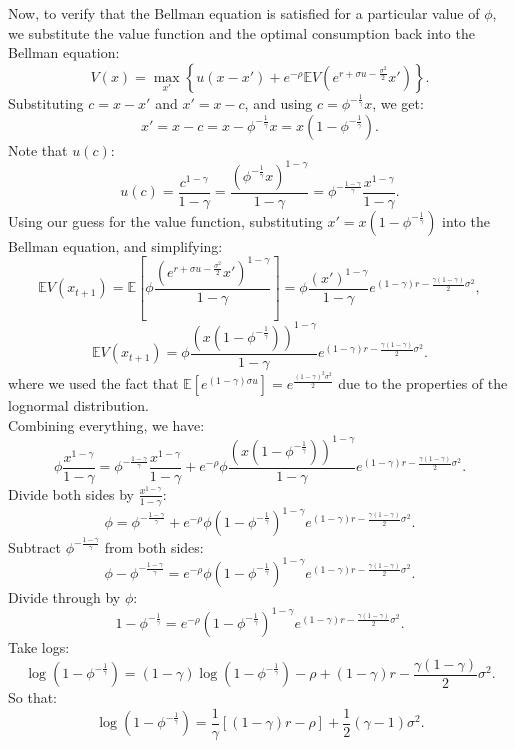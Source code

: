 \documentclass[11pt]{extarticle}
\theoremstyle{plain}
\theoremstyle{definition}
\begin{document}
\begin{enumerate}[(a)]
\begin{enumerate}[(a)]
Now, to verify that the Bellman equation is satisfied for a particular value of \( \phi \), we substitute the value function and the optimal consumption back into the Bellman equation:
\[
V(x) = \max_{x'} \left\{ u(x - x') + e^{-\rho} \mathbb{E} V\left( e^{r + \sigma u - \frac{\sigma^2}{2}} x' \right) \right\}.
\]
Substituting \( c = x - x' \) and \( x' = x - c \), and using \( c = \phi^{-\frac{1}{\gamma}} x \), we get:
\[
x' = x - c = x - \phi^{-\frac{1}{\gamma}} x = x (1 - \phi^{-\frac{1}{\gamma}}).
\]
Note that \( u(c) \):
\[
u(c) = \frac{c^{1 - \gamma}}{1 - \gamma} = \frac{(\phi^{-\frac{1}{\gamma}} x)^{1 - \gamma}}{1 - \gamma} = \phi^{-\frac{1 - \gamma}{\gamma}} \frac{x^{1 - \gamma}}{1 - \gamma}.
\]
Using our guess for the value function, substituting \( x' = x (1 - \phi^{-\frac{1}{\gamma}}) \) into the Bellman equation,  and simplifying:
\[
\mathbb{E} V(x_{t+1}) = \mathbb{E} \left[ \phi \frac{\left( e^{r + \sigma u - \frac{\sigma^2}{2}} x' \right)^{1 - \gamma}}{1 - \gamma} \right] = \phi \frac{(x')^{1 - \gamma}}{1 - \gamma} e^{(1 - \gamma) r - \frac{\gamma (1 - \gamma)}{2} \sigma^2},
\]
\[
\mathbb{E} V(x_{t+1}) = \phi \frac{\left( x (1 - \phi^{-\frac{1}{\gamma}}) \right)^{1 - \gamma}}{1 - \gamma} e^{(1 - \gamma) r - \frac{\gamma (1 - \gamma)}{2} \sigma^2}.
\]
where we used the fact that \( \mathbb{E}[e^{(1 - \gamma) \sigma u}] = e^{\frac{(1 - \gamma)^2 \sigma^2}{2}} \) due to the properties of the lognormal distribution.\\
Combining everything, we have:
\[
\phi \frac{x^{1 - \gamma}}{1 - \gamma} = \phi^{-\frac{1 - \gamma}{\gamma}} \frac{x^{1 - \gamma}}{1 - \gamma} + e^{-\rho} \phi \frac{\left( x (1 - \phi^{-\frac{1}{\gamma}}) \right)^{1 - \gamma}}{1 - \gamma} e^{(1 - \gamma) r - \frac{\gamma (1 - \gamma)}{2} \sigma^2}.
\]
Divide both sides by \( \frac{x^{1 - \gamma}}{1 - \gamma} \):
\[
\phi = \phi^{-\frac{1 - \gamma}{\gamma}} + e^{-\rho} \phi \left( 1 - \phi^{-\frac{1}{\gamma}} \right)^{1 - \gamma} e^{(1 - \gamma) r - \frac{\gamma (1 - \gamma)}{2} \sigma^2}.
\]
Subtract \( \phi^{-\frac{1 - \gamma}{\gamma}} \) from both sides:
\[
\phi - \phi^{-\frac{1 - \gamma}{\gamma}} = e^{-\rho} \phi \left( 1 - \phi^{-\frac{1}{\gamma}} \right)^{1 - \gamma} e^{(1 - \gamma) r - \frac{\gamma (1 - \gamma)}{2} \sigma^2}.
\]
Divide through by $\phi$:
\[
1 - \phi^{-\frac{1}{\gamma}} = e^{-\rho} \left( 1 - \phi^{-\frac{1}{\gamma}} \right)^{1 - \gamma} e^{(1 - \gamma) r - \frac{\gamma (1 - \gamma)}{2} \sigma^2}.
\]
Take logs:
\[
\log \left( 1 - \phi^{-\frac{1}{\gamma}} \right)  = (1-\gamma) \log \left( 1 - \phi^{-\frac{1}{\gamma}} \right) -\rho + (1 - \gamma) r - \frac{\gamma (1 - \gamma)}{2} \sigma^2.
\]
So that:
\[
\log \left( 1 - \phi^{-\frac{1}{\gamma}} \right) = \frac{1}{\gamma} \left[ (1 - \gamma) r - \rho \right] + \frac{1}{2} (\gamma - 1) \sigma^2.
\]


\end{enumerate}
\end{enumerate}
\end{document}
